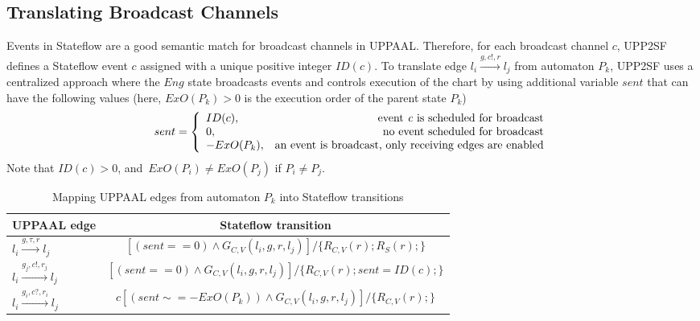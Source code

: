 \subsection{Translating Broadcast Channels}
Events in Stateflow are a good semantic match for broadcast channels in UPPAAL. Therefore, for each broadcast channel $c$, UPP2SF defines a Stateflow event $c$ assigned with a unique positive integer $ID(c)$. To translate edge $l_i \xrightarrow{g,c!,r} l_j$ from automaton $P_k$, UPP2SF uses a centralized approach where the $Eng$ state broadcasts events and controls execution of the chart by using additional variable $sent$ that can have the following values (here, $ExO(P_k)>0$ is the execution order of the parent state $P_k$)
\begin{equation}
sent = \left\{
\begin{array}{lr} 
ID(c), & \hbox{event \textit{c} is scheduled for broadcast}\\
0, & \hbox{no event scheduled for broadcast}\\
-ExO(P_k), & \hbox{an event is broadcast, only receiving edges are enabled}
\end{array}
\right.
\end{equation}
Note that $ID(c)>0$, and~$ExO(P_i)\neq ExO(P_j)$ if $P_i\neq P_j$. 



\begin{table}[!t]
\centering
{
\begin{tabular}{|l|c|}
\hline
UPPAAL edge & Stateflow transition\\\hline
$l_i \xrightarrow{g,\tau,r} l_j$		& $[(sent==0)\wedge G_{C,V}(l_i,g,r,l_j)] /\{R_{C,V}(r); R_S(r);\}$ 			\\\hline
$l_i \xrightarrow{g_j,c!,r_j} l_j$	& $[(sent==0) \wedge G_{C,V}(l_i,g,r,l_j)] /\{R_{C,V}(r); sent=ID(c);\}$	\\\hline
$l_i \xrightarrow{g_i,c?,r_i} l_j$	& $c[(sent\sim=-ExO(P_k))\wedge G_{C,V}(l_i,g,r,l_j)] /\{R_{C,V}(r); \}$		\\\hline
\end{tabular}
}
\caption{Mapping UPPAAL edges from automaton $P_k$ into Stateflow transitions}
\label{tab:up2sf_bc}
\end{table}


